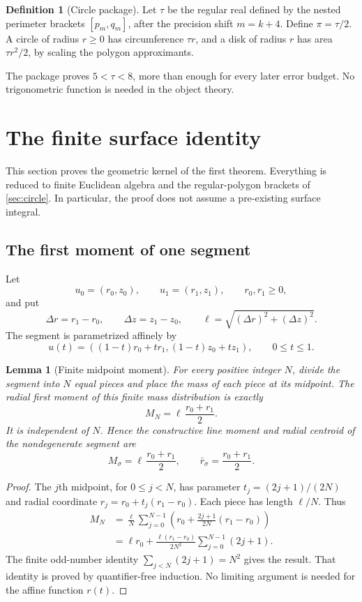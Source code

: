 \documentclass[11pt]{article}
\newtheorem{lemma}[theorem]{Lemma}
\theoremstyle{definition}
\newtheorem{definition}[theorem]{Definition}
\begin{document}
\begin{definition}[Circle package]
Let \(\tau\) be the regular real defined by the nested perimeter brackets
\([p_m,q_m]\), after the precision shift \(m=k+4\).  Define
\(\pi=\tau/2\).  A circle of radius \(r\geq0\) has circumference \(\tau r\),
and a disk of radius \(r\) has area \(\tau r^2/2\), by scaling the polygon
approximants.
\end{definition}

The package proves \(5<\tau<8\), more than enough for every later error budget.
No trigonometric function is needed in the object theory.


\section{The finite surface identity}
\label{sec:finite-surface}

This section proves the geometric kernel of the first theorem.  Everything is
reduced to finite Euclidean algebra and the regular-polygon brackets of
\cref{sec:circle}.  In particular, the proof does not assume a pre-existing
surface integral.

\subsection{The first moment of one segment}

Let
\[
 u_0=(r_0,z_0),\qquad u_1=(r_1,z_1),\qquad r_0,r_1\geq0,
\]
and put
\[
 \Delta r=r_1-r_0,\qquad \Delta z=z_1-z_0,
 \qquad \ell=\sqrt{(\Delta r)^2+(\Delta z)^2}.
\]
The segment is parametrized affinely by
\[
 u(t)=((1-t)r_0+tr_1,(1-t)z_0+tz_1),\qquad0\leq t\leq1.
\]

\begin{lemma}[Finite midpoint moment]
\label{lem:segment-moment}
For every positive integer $N$, divide the segment into $N$ equal pieces and
place the mass of each piece at its midpoint.  The radial first moment of this
finite mass distribution is exactly
\[
 M_N=\ell\,\frac{r_0+r_1}{2}.
\]
It is independent of $N$.  Hence the constructive line moment and radial
centroid of the nondegenerate segment are
\[
 M_\sigma=\ell\,\frac{r_0+r_1}{2},
 \qquad
 \bar r_\sigma=\frac{r_0+r_1}{2}.
\]
\end{lemma}

\begin{proof}
The $j$th midpoint, for $0\leq j<N$, has parameter
$t_j=(2j+1)/(2N)$ and radial coordinate
$r_j=r_0+t_j(r_1-r_0)$.  Each piece has length $\ell/N$.  Thus
\begin{align*}
 M_N
 &=\frac{\ell}{N}\sum_{j=0}^{N-1}
   \left(r_0+\frac{2j+1}{2N}(r_1-r_0)\right)\\
 &=\ell r_0+\frac{\ell(r_1-r_0)}{2N^2}
   \sum_{j=0}^{N-1}(2j+1).
\end{align*}
The finite odd-number identity
$\sum_{j<N}(2j+1)=N^2$ gives the result.  That identity is proved by
quantifier-free induction.  No limiting argument is needed for the affine
function $r(t)$.
\end{proof}
\end{document}
